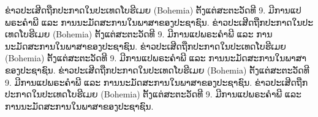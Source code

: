 ຂ່າວປະເສີດຖືກປະກາດໃນປະເທດໂບຮີເມຍ (Bohemia) ຕັ້ງແຕ່ສະຕະວັດທີ 9. ມີການແປພຣະຄຳພີ ແລະ ການນະມັດສະການໃນພາສາຂອງປະຊາຊົນ. ຂ່າວປະເສີດຖືກປະກາດໃນປະເທດໂບຮີເມຍ (Bohemia) ຕັ້ງແຕ່ສະຕະວັດທີ 9. ມີການແປພຣະຄຳພີ ແລະ ການນະມັດສະການໃນພາສາຂອງປະຊາຊົນ. ຂ່າວປະເສີດຖືກປະກາດໃນປະເທດໂບຮີເມຍ (Bohemia) ຕັ້ງແຕ່ສະຕະວັດທີ 9. ມີການແປພຣະຄຳພີ ແລະ ການນະມັດສະການໃນພາສາຂອງປະຊາຊົນ. ຂ່າວປະເສີດຖືກປະກາດໃນປະເທດໂບຮີເມຍ (Bohemia) ຕັ້ງແຕ່ສະຕະວັດທີ 9. ມີການແປພຣະຄຳພີ ແລະ ການນະມັດສະການໃນພາສາຂອງປະຊາຊົນ. ຂ່າວປະເສີດຖືກປະກາດໃນປະເທດໂບຮີເມຍ (Bohemia) ຕັ້ງແຕ່ສະຕະວັດທີ 9. ມີການແປພຣະຄຳພີ ແລະ ການນະມັດສະການໃນພາສາຂອງປະຊາຊົນ. 